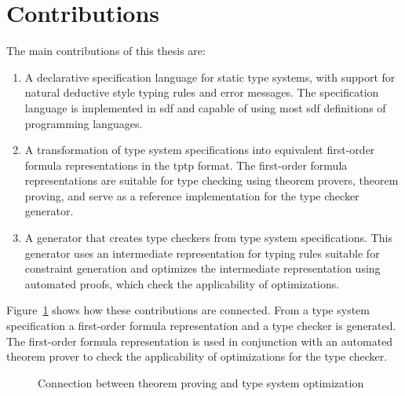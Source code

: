 \section{Contributions}
The main contributions of this thesis are:
\begin{enumerate}
\item A declarative specification language for static type systems,
  with support for natural deductive style typing rules and error
  messages. The specification language is implemented in \gls{sdf} and
  capable of using most \gls{sdf} definitions of programming
  languages.
\item A transformation of type system specifications into equivalent
  first-order formula representations in the \gls{tptp} format. The
  first-order formula representations are suitable for type checking
  using theorem provers, theorem proving, and serve as a reference
  implementation for the type checker generator.
\item A generator that creates type checkers from type system
  specifications. This generator uses an intermediate representation
  for typing rules suitable for constraint generation and optimizes
  the intermediate representation using automated proofs, which check
  the applicability of optimizations.
\end{enumerate}

Figure~\ref{fig:interconnection} shows how these contributions are
connected. From a type system specification a first-order formula
representation and a type checker is generated. The first-order
formula representation is used in conjunction with an automated
theorem prover to check the applicability of optimizations for the
type checker.

\begin{figure}
\label{fig:interconnection}
\caption{Connection between theorem proving and type system optimization}
\end{figure}

